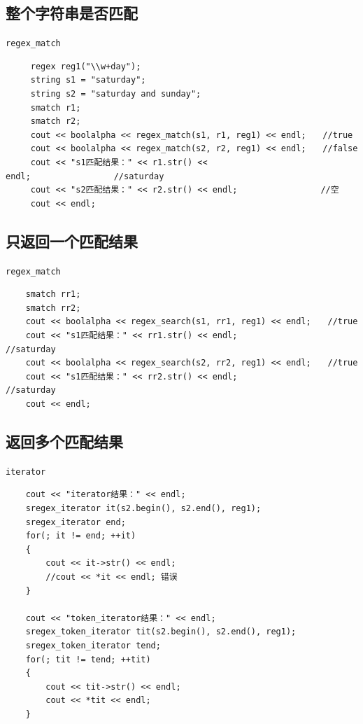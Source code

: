 \documentclass[UTF8,a4paper,12pt]{ctexbook}
\begin{document}
		\subsection{整个字符串是否匹配} \verb|regex_match|
			\begin{lstlisting}
	 regex reg1("\\w+day");
	 string s1 = "saturday";
	 string s2 = "saturday and sunday";
	 smatch r1;
	 smatch r2;
	 cout << boolalpha << regex_match(s1, r1, reg1) << endl;　　//true
	 cout << boolalpha << regex_match(s2, r2, reg1) << endl;　　//false
	 cout << "s1匹配结果：" << r1.str() << endl;　　　　　　　　　　//saturday
	 cout << "s2匹配结果：" << r2.str() << endl;　　　　　　　　　　//空
	 cout << endl;
			\end{lstlisting}
		\subsection{只返回一个匹配结果} \verb|regex_match|
			\begin{lstlisting}
	smatch rr1;
	smatch rr2;
	cout << boolalpha << regex_search(s1, rr1, reg1) << endl;　　//true
	cout << "s1匹配结果：" << rr1.str() << endl; 　　　　　　　　　　//saturday
	cout << boolalpha << regex_search(s2, rr2, reg1) << endl;　　//true
	cout << "s1匹配结果：" << rr2.str() << endl;　　　　　　　　　　 //saturday
	cout << endl;
			\end{lstlisting}
		
		\subsection{返回多个匹配结果} \verb|iterator|
			\begin{lstlisting}
	cout << "iterator结果：" << endl;
	sregex_iterator it(s2.begin(), s2.end(), reg1);
	sregex_iterator end;
	for(; it != end; ++it)
	{
		cout << it->str() << endl;
		//cout << *it << endl; 错误
	}
	
	cout << "token_iterator结果：" << endl;
	sregex_token_iterator tit(s2.begin(), s2.end(), reg1);
	sregex_token_iterator tend;
	for(; tit != tend; ++tit)
	{
		cout << tit->str() << endl;
		cout << *tit << endl;
	}
			\end{lstlisting}
			
\end{document}
